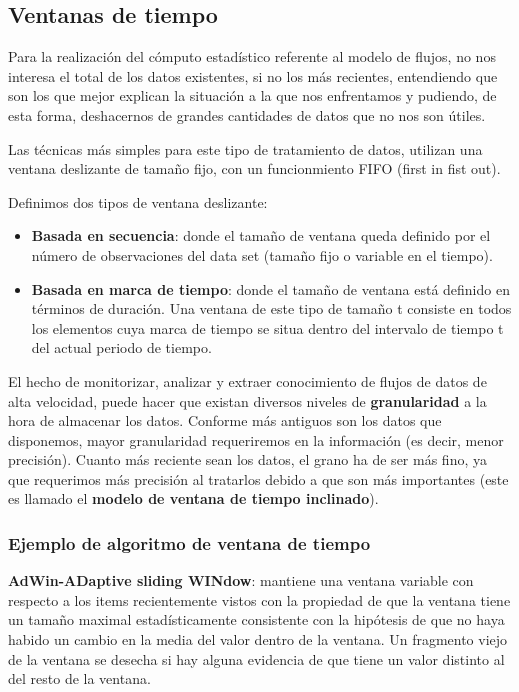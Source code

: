 \subsection{Ventanas de tiempo}

Para la realización del cómputo estadístico referente al modelo de flujos, no nos interesa el total de los datos existentes, si no los más recientes, entendiendo que son los que mejor explican la situación a la que nos enfrentamos y pudiendo, de esta forma, deshacernos de grandes cantidades de datos que no nos son útiles.

Las técnicas más simples para este tipo de tratamiento de datos, utilizan una ventana deslizante de tamaño fijo, con un funcionmiento FIFO (first in fist out).

Definimos dos tipos de ventana deslizante:
\begin{itemize}
	\item \textbf{Basada en secuencia}: donde el tamaño de ventana queda definido por el número de observaciones del data set (tamaño fijo o variable en el tiempo).
	\item \textbf{Basada en marca de tiempo}: donde el tamaño de ventana está definido en términos de duración. Una ventana de este tipo de tamaño t consiste en todos los elementos cuya marca de tiempo
	se situa dentro del intervalo de tiempo t del actual periodo de tiempo.
\end{itemize}

El hecho de monitorizar, analizar y extraer conocimiento de flujos de datos de alta velocidad, puede hacer que existan diversos niveles de \textbf{granularidad} a la hora de 
almacenar los datos. Conforme más antiguos son los datos que disponemos, mayor granularidad requeriremos en la información (es decir, menor precisión). Cuanto más
reciente sean los datos, el grano ha de ser más fino, ya que requerimos más precisión al tratarlos debido a que son más importantes (este es llamado el\textbf{ modelo de ventana de tiempo inclinado}).

\subsubsection{Ejemplo de algoritmo de ventana de tiempo}

\textbf{AdWin-ADaptive sliding WINdow}: mantiene una ventana variable con respecto a los items recientemente vistos con la propiedad de que la ventana tiene un tamaño maximal
estadísticamente consistente con la hipótesis de que no haya habido un cambio en la media del valor dentro de la ventana. Un fragmento viejo de la ventana se desecha
si hay alguna evidencia de que tiene un valor distinto al del resto de la ventana.


